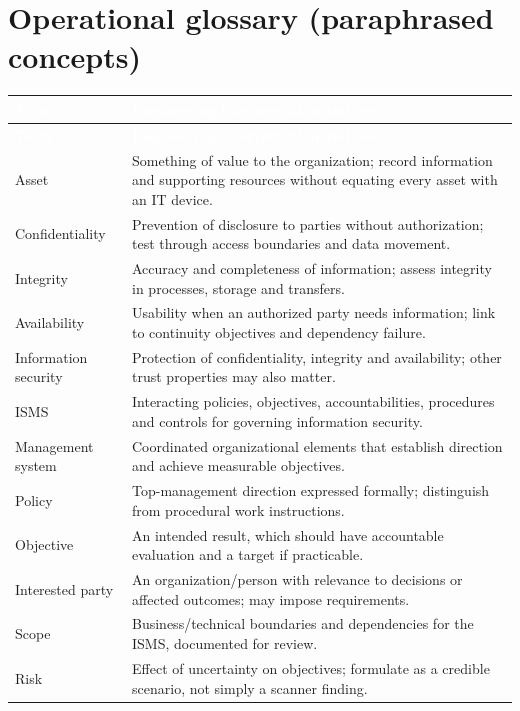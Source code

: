 \documentclass[11pt,letterpaper]{article}
\begin{document}
\section{Operational glossary (paraphrased concepts)}
\small{}\begin{longtable}{>{\raggedright\arraybackslash}p{}>{\raggedright\arraybackslash}p{}}
\rowcolor{navy} \textcolor{white}{\textbf{Term}} & \textcolor{white}{\textbf{Engineering interpretation and use}}\\
\endfirsthead
\rowcolor{navy} \textcolor{white}{\textbf{Term}} & \textcolor{white}{\textbf{Engineering interpretation and use}}\\
\endhead
Asset & Something of value to the organization; record information and supporting resources without equating every asset with an IT device.\\
Confidentiality & Prevention of disclosure to parties without authorization; test through access boundaries and data movement.\\
Integrity & Accuracy and completeness of information; assess integrity in processes, storage and transfers.\\
Availability & Usability when an authorized party needs information; link to continuity objectives and dependency failure.\\
Information security & Protection of confidentiality, integrity and availability; other trust properties may also matter.\\
ISMS & Interacting policies, objectives, accountabilities, procedures and controls for governing information security.\\
Management system & Coordinated organizational elements that establish direction and achieve measurable objectives.\\
Policy & Top-management direction expressed formally; distinguish from procedural work instructions.\\
Objective & An intended result, which should have accountable evaluation and a target if practicable.\\
Interested party & An organization/person with relevance to decisions or affected outcomes; may impose requirements.\\
Scope & Business/technical boundaries and dependencies for the ISMS, documented for review.\\
Risk & Effect of uncertainty on objectives; formulate as a credible scenario, not simply a scanner finding.\\

\end{longtable}
\end{document}
